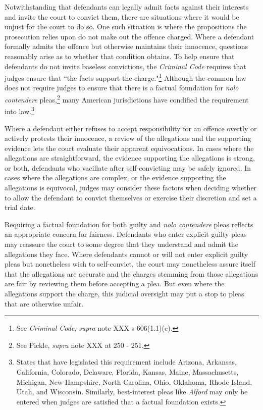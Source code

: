Notwithstanding that defendants can legally admit facts against their interests and invite the court to convict them, there are situations where it would be unjust for the court to do so. One such situation is where the propositions the prosecution relies upon do not make out the offence charged. Where a defendant formally admits the offence but otherwise maintains their innocence, questions reasonably arise as to whether that condition obtains. To help ensure that defendants do not invite baseless convictions, the \textit{Criminal Code} requires that judges ensure that ``the facts support the charge."\footnote{See \textit{Criminal Code}, \textit{supra} note XXX s 606(1.1)(c).} Although the common law does not require judges to ensure that there is a factual foundation for \textit{nolo contendere} pleas,\footnote{See Pickle, \textit{supra} note XXX at 250 - 251.} many American jurisdictions have condified the requirement into law.\footnote{States that have legislated this requirement include Arizona, Arkansas, California, Colorado, Delaware, Florida, Kansas, Maine, Massachusetts, Michigan, New Hampshire, North Carolina, Ohio, Oklahoma, Rhode Island, Utah, and Wisconsin. Similarly, best-interest pleas like \textit{Alford} may only be entered when judges are satisfied that a factual foundation exists.}

Where a defendant either refuses to accept responsibility for an offence overtly or actively protests their innocence, a review of the allegations and the supporting evidence lets the court evaluate their apparent equivocations. In cases where the allegations are straightforward, the evidence supporting the allegations is strong, or both, defendants who vacillate after self-convicting may be safely ignored. In cases where the allegations are complex, or the evidence supporting the allegations is equivocal, judges may consider these factors when deciding whether to allow the defendant to convict themselves or exercise their discretion and set a trial date.

Requiring a factual foundation for both guilty and \textit{nolo contendere} pleas reflects an appropriate concern for fairness. Defendants who enter explicit guilty pleas may reassure the court to some degree that they understand and admit the allegations they face. Where defendants cannot or will not enter explicit guilty pleas but nonetheless wish to self-convict, the court may nonetheless assure itself that the allegations are accurate and the charges stemming from those allegations are fair by reviewing them before accepting a plea. But even where the allegations support the charge, this judicial oversight may put a stop to pleas that are otherwise unfair.

